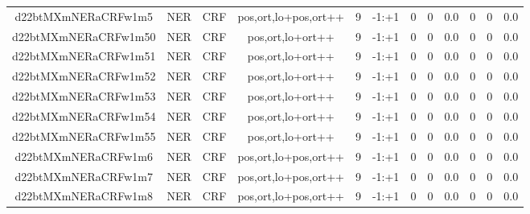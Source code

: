 \documentclass[a4paper]{article}
\begin{document}
\begin{landscape}
\begin{center}
\begin{tabular}{ |c|c|c|c|c|c|c|c|c|c|c|c|}
 
 	
 	\small{ d22btMXmNERaCRFw1m5 } & \small{ NER} & \small{  CRF }  & pos,ort,lo+pos,ort++  &  9 &  \small{  -1:+1 }  &  0 & 0 & 0.0  &  0 & 0 & 0.0 \\
 	

 
 	
 	\small{ d22btMXmNERaCRFw1m50 } & \small{ NER} & \small{  CRF }  & pos,ort,lo+ort++  &  9 &  \small{  -1:+1 }  &  0 & 0 & 0.0  &  0 & 0 & 0.0 \\
 	

 
 	
 	\small{ d22btMXmNERaCRFw1m51 } & \small{ NER} & \small{  CRF }  & pos,ort,lo+ort++  &  9 &  \small{  -1:+1 }  &  0 & 0 & 0.0  &  0 & 0 & 0.0 \\
 	

 
 	
 	\small{ d22btMXmNERaCRFw1m52 } & \small{ NER} & \small{  CRF }  & pos,ort,lo+ort++  &  9 &  \small{  -1:+1 }  &  0 & 0 & 0.0  &  0 & 0 & 0.0 \\
 	

 
 	
 	\small{ d22btMXmNERaCRFw1m53 } & \small{ NER} & \small{  CRF }  & pos,ort,lo+ort++  &  9 &  \small{  -1:+1 }  &  0 & 0 & 0.0  &  0 & 0 & 0.0 \\
 	

 
 	
 	\small{ d22btMXmNERaCRFw1m54 } & \small{ NER} & \small{  CRF }  & pos,ort,lo+ort++  &  9 &  \small{  -1:+1 }  &  0 & 0 & 0.0  &  0 & 0 & 0.0 \\
 	

 
 	
 	\small{ d22btMXmNERaCRFw1m55 } & \small{ NER} & \small{  CRF }  & pos,ort,lo+ort++  &  9 &  \small{  -1:+1 }  &  0 & 0 & 0.0  &  0 & 0 & 0.0 \\
 	

 
 	
 	\small{ d22btMXmNERaCRFw1m6 } & \small{ NER} & \small{  CRF }  & pos,ort,lo+pos,ort++  &  9 &  \small{  -1:+1 }  &  0 & 0 & 0.0  &  0 & 0 & 0.0 \\
 	

 
 	
 	\small{ d22btMXmNERaCRFw1m7 } & \small{ NER} & \small{  CRF }  & pos,ort,lo+pos,ort++  &  9 &  \small{  -1:+1 }  &  0 & 0 & 0.0  &  0 & 0 & 0.0 \\
 	

 
 	
 	\small{ d22btMXmNERaCRFw1m8 } & \small{ NER} & \small{  CRF }  & pos,ort,lo+pos,ort++  &  9 &  \small{  -1:+1 }  &  0 & 0 & 0.0  &  0 & 0 & 0.0 \\
 	


\end{tabular}
\end{center}
\end{landscape}
\end{document}
